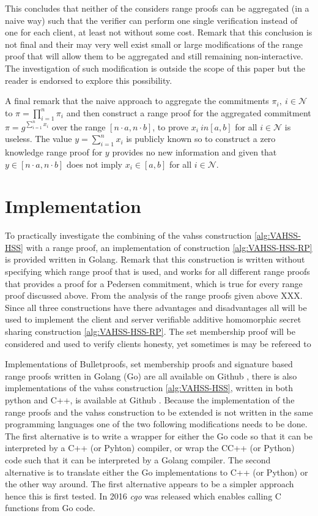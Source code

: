 This concludes that neither of the considers range proofs can be aggregated  (in a naive way) such that the verifier can perform one single verification instead of one for each client, at least not without some cost. Remark that this conclusion is not final and their may very well exist small or large modifications of the range proof that will allow them to be aggregated and still remaining non-interactive. The investigation of such modification is outside the scope of this paper but the reader is endorsed to explore this possibility. 

A final remark that the naive approach to aggregate the commitments $\pi_i, \: i\in\mathcal{N}$ to $\pi = \prod_{i=1}^n \pi_i$ and then construct a range proof for the aggregated commitment $\pi = g^{\sum_{i=1}^n x_i}$ over the range $[n\cdot a,n\cdot b]$, to prove $x_i\ in [a,b]$ for all $i \in\mathcal{N}$  is useless. The value $y=\sum_{i=1}^n x_i$ is publicly known so to construct a zero knowledge range proof for $y $ provides no new information and given that $y\in [n\cdot a,n\cdot b]$ does not imply $x_i\in [a,b]$ for all $i\in\mathcal{N}$. 

\section{Implementation}
To practically investigate the combining of the vahss construction \ref{alg:VAHSS-HSS} with a range proof, an implementation of construction \ref{alg:VAHSS-HSS-RP} is provided written in Golang. Remark that this construction is written without specifying which range proof that is used, and works for all different range proofs that provides a proof for a Pedersen commitment, which is true for every range proof discussed above. From the analysis of the range proofs given above XXX. Since all three constructions have there advantages and disadvantages all will be used to implement the client and server verifiable additive homomorphic secret sharing construction \ref{alg:VAHSS-HSS-RP}. The set membership proof will be considered and used to verify clients honesty, yet sometimes is may be refereed to 

Implementations of Bulletproofs, set membership proofs and signature based range proofs written in Golang (Go) are all available on Github \cite{Git:RP}, there is also   implementations of the vahss construction \ref{alg:VAHSS-HSS}, written in both python and C++, is available at Github \cite{Git:python_vahss} \cite{Git:C_vahss}.
Because the implementation of the range proofs and the vahss construction to be extended is not written in the same programming languages one of the two following modifications needs to be done. The first alternative is to write a wrapper for either the Go code so that it can be interpreted by a C++ (or Pyhton) compiler, or wrap the CC++ (or Python) code such that it can be interpreted by a Golang compiler. The second alternative is to translate either the Go implementations to C++ (or Python) or the other way around. The first alternative appears to be a simpler approach hence this is first tested. In 2016 \textit{cgo} was released which enables calling C functions from Go code. 

